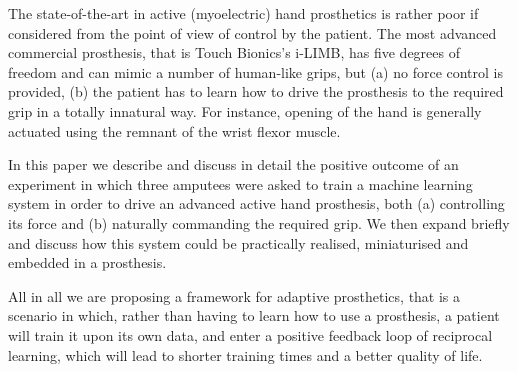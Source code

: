 The state-of-the-art in active (myoelectric) hand prosthetics is
rather poor if considered from the point of view of control by the
patient. The most advanced commercial prosthesis, that is Touch
Bionics's i-LIMB, has five degrees of freedom and can mimic a number
of human-like grips, but (a) no force control is provided, (b) the
patient has to learn how to drive the prosthesis to the required grip
in a totally innatural way. For instance, opening of the hand is
generally actuated using the remnant of the wrist flexor muscle.

In this paper we describe and discuss in detail the positive outcome
of an experiment in which three amputees were asked to train a machine
learning system in order to drive an advanced active hand prosthesis,
both (a) controlling its force and (b) naturally commanding the
required grip. We then expand briefly and discuss how this system
could be practically realised, miniaturised and embedded in a
prosthesis.

All in all we are proposing a framework for adaptive prosthetics, that
is a scenario in which, rather than having to learn how to use a
prosthesis, a patient will train it upon its own data, and enter a
positive feedback loop of reciprocal learning, which will lead to
shorter training times and a better quality of life.
